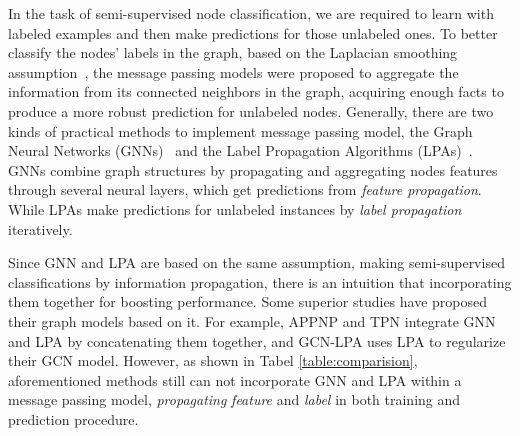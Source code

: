 \documentclass{article} \usepackage{iclr2021_conference,times}
\begin{document}
In the task of semi-supervised node classification, we are required to learn with labeled examples and then make predictions for those unlabeled ones. To better classify the nodes' labels in the graph, based on the Laplacian smoothing assumption~\citep{li2018deeper, xu2018representation}, the message passing models were proposed to aggregate the information from its connected neighbors in the graph, acquiring
enough facts to produce a more robust prediction for unlabeled nodes. Generally, there are two kinds of practical methods to implement message passing model, the Graph Neural Networks (GNNs)~\citep{kipf2016semi, hamilton2017inductive, xu2018representation, liao2019lanczosnet, xu2018powerful, qu2019gmnn} and the Label Propagation Algorithms (LPAs)~\citep{zhu2005semi, zhu2003semi, zhang2007hyperparameter, wang2007label, karasuyama2013manifold, gong2016label, liu2019learning}. GNNs combine graph structures by propagating and aggregating nodes features through several neural layers, which get predictions from \emph{feature propagation}. While LPAs make predictions for unlabeled instances by \emph{label propagation} iteratively.


Since GNN and LPA are based on the same assumption, making semi-supervised classifications by information propagation, there is an intuition that incorporating them together for boosting performance. Some superior studies have proposed their graph models based on it. For example, APPNP \citep{klicpera2019predict} and TPN \citep{liu2019learning} integrate GNN and LPA by concatenating them together, and GCN-LPA \citep{wang2019unifying} uses LPA to regularize their GCN model. However, as shown in Tabel \ref{table:comparision}, aforementioned methods 
still can not incorporate GNN and LPA within a message passing model, \emph{propagating} \emph{feature} and \emph{label} in both training and prediction procedure.
\end{document}
